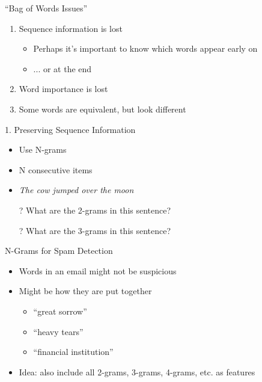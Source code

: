 \documentclass[aspectratio=169]{beamer}
\begin{document}
\begin{frame}{``Bag of Words Issues''}

\begin{enumerate}
\item Sequence information is lost
\begin{itemize}
\item Perhaps it's important to know which words appear early on
\item ... or at the end
\end{itemize}
\item Word importance is lost
\item Some words are equivalent, but look different
\end{enumerate}
\end{frame}
\begin{frame}{1. Preserving Sequence Information}

\begin{itemize}
\item Use N-grams
\item N consecutive items
\item \textit{The cow jumped over the moon}
\item[?] What are the 2-grams in this sentence?
\item[?] What are the 3-grams in this sentence?
\end{itemize}
\end{frame}
\begin{frame}{N-Grams for Spam Detection}

\begin{itemize}
\item Words in an email might not be suspicious
\item Might be how they are put together
	\begin{itemize}
	\item ``great sorrow''
	\item ``heavy tears''
	\item ``financial institution''
	\end{itemize}
\item Idea: also include all 2-grams, 3-grams, 4-grams, etc. as features
\end{itemize}
\end{frame}
\end{document}
